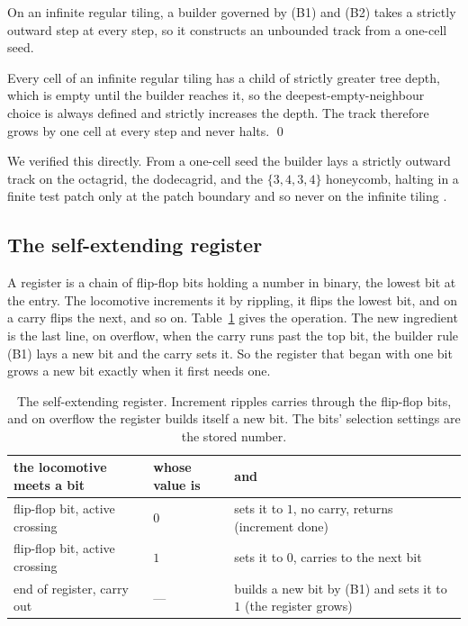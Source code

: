 \begin{lemma}
\label{lem:build}
On an infinite regular tiling, a builder governed by (B1) and (B2) takes a strictly outward step at every step,
so it constructs an unbounded track from a one-cell seed.
\end{lemma}

Every cell of an infinite regular tiling has a child of strictly greater tree depth, which is empty until the
builder reaches it, so the deepest-empty-neighbour choice is always defined and strictly increases the depth.
The track therefore grows by one cell at every step and never halts. \qed

We verified this directly. From a one-cell seed the builder lays a strictly outward track on the octagrid, the
dodecagrid, and the $\{3,4,3,4\}$ honeycomb, halting in a finite test patch only at the patch boundary and so
never on the infinite tiling \cite{pollard2026vibe}.

\subsection{The self-extending register}

A register is a chain of flip-flop bits holding a number in binary, the lowest bit at the entry. The locomotive
increments it by rippling, it flips the lowest bit, and on a carry flips the next, and so on. Table~\ref{tab:reg}
gives the operation. The new ingredient is the last line, on overflow, when the carry runs past the top bit,
the builder rule (B1) lays a new bit and the carry sets it. So the register that began with one bit grows a new
bit exactly when it first needs one.

\begin{table}[ht]
\centering
\begin{tabular}{@{}llp{7.4cm}@{}}
\toprule
the locomotive meets a bit & whose value is & and \\
\midrule
flip-flop bit, active crossing & $0$ & sets it to $1$, no carry, returns (increment done) \\
flip-flop bit, active crossing & $1$ & sets it to $0$, carries to the next bit \\
end of register, carry out & --- & builds a new bit by (B1) and sets it to $1$ (the register grows) \\
\bottomrule
\end{tabular}
\caption{The self-extending register. Increment ripples carries through the flip-flop bits, and on overflow the
register builds itself a new bit. The bits' selection settings are the stored number.}
\label{tab:reg}
\end{table}

